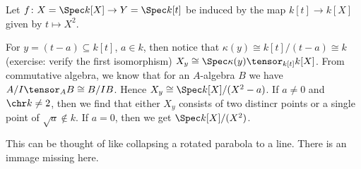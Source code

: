 Let $f\colon X = \Spec k[X]\to Y = \Spec k[t]$ be induced by the map
 $k[t] \to k[X]$ given by $t\mapsto X^2$.

For $y  = (t-a) \subseteq k[t]$, $a \in k$, then notice that $\kappa(y) \cong k[t]/(t-a) \cong k$
(exercise: verify the first isomorphism)
$X_y \cong \Spec \kappa(y)\tensor_{k[t]} k[X]$. From commutative algebra, we know
that for an  $A$-algebra $B$ we have $A/I \tensor_A B\cong B/{IB}$.
Hence $X_y \cong \Spec k[X]/(X^2-a)$. If $a\neq 0$ and $\chr k\neq 2$, then we
find that either $X_y$ consists of two distincr points or a single point
of $\sqrt{a} \notin k$. If $a = 0$, then we get $\Spec k[X]/(X^2)$.

This can be thought of like collapsing a rotated parabola to a line. There
is an immage missing here.
